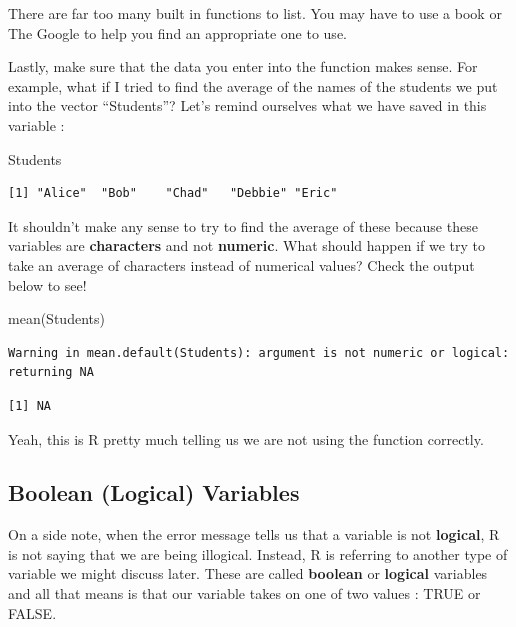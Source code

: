 \documentclass[
  letterpaper,
  DIV=11,
  numbers=noendperiod]{scrreprt}
\newenvironment{Shaded}{\begin{snugshade}}{\end{snugshade}}
\newcommand{\FunctionTok}[1]{\textcolor[rgb]{0.28,0.35,0.67}{#1}}
\newcommand{\NormalTok}[1]{\textcolor[rgb]{0.00,0.23,0.31}{#1}}
\begin{document}
There are far too many built in functions to list. You may have to use a
book or The Google to help you find an appropriate one to use.

Lastly, make sure that the data you enter into the function makes sense.
For example, what if I tried to find the average of the names of the
students we put into the vector ``Students''? Let's remind ourselves
what we have saved in this variable :

\begin{Shaded}
\begin{Highlighting}[]
\NormalTok{Students}
\end{Highlighting}
\end{Shaded}

\begin{verbatim}
[1] "Alice"  "Bob"    "Chad"   "Debbie" "Eric"  
\end{verbatim}

It shouldn't make any sense to try to find the average of these because
these variables are \textbf{characters} and not \textbf{numeric}. What
should happen if we try to take an average of characters instead of
numerical values? Check the output below to see!

\begin{Shaded}
\begin{Highlighting}[]
\FunctionTok{mean}\NormalTok{(Students)}
\end{Highlighting}
\end{Shaded}

\begin{verbatim}
Warning in mean.default(Students): argument is not numeric or logical:
returning NA
\end{verbatim}

\begin{verbatim}
[1] NA
\end{verbatim}

Yeah, this is R pretty much telling us we are not using the function
correctly.

\subsection*{Boolean (Logical)
Variables}\label{boolean-logical-variables}

On a side note, when the error message tells us that a variable is not
\textbf{logical}, R is not saying that we are being illogical. Instead,
R is referring to another type of variable we might discuss later. These
are called \textbf{boolean} or \textbf{logical} variables and all that
means is that our variable takes on one of two values : TRUE or FALSE.
\end{document}
